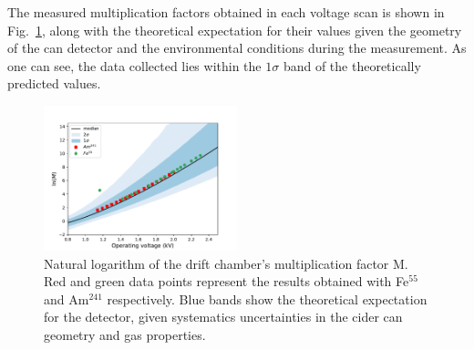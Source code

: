 



The measured multiplication factors obtained in each voltage scan is shown in Fig.~\ref{final_lnm}, along with the theoretical expectation for their values given the geometry of the can detector and the environmental conditions during the measurement. As one can see, the data collected lies within the $1\sigma$ band of the theoretically predicted values.

\begin{figure}[htb]
  \includegraphics[width=0.5\textwidth]{graphics/lnM_final_plot.pdf}
  \caption{Natural logarithm of the drift chamber's multiplication factor M. Red and green data points represent the results obtained with Fe$^{55}$ and Am$^{241}$ respectively. Blue bands show the theoretical expectation for the detector, given systematics uncertainties in the cider can geometry and gas properties.}
  \label{final_lnm}
\end{figure}

\FloatBarrier